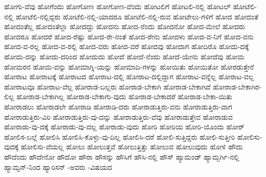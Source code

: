 {ಹೋಗು-ವೆವು
ಹೋಗೆಂದು
ಹೋಗೋಣ
ಹೋಗೋಣ-ವೆಂದು
ಹೋಟಲಿಗೆ
ಹೋಟಲಿ-ನಲ್ಲಿ
ಹೋಟಲ್
ಹೋಟೆಲಿ-ನಲ್ಲಿ
ಹೋಟೆಲಿ-ನಲ್ಲಿದ್ದರು
ಹೋಟೆಲಿ-ನಲ್ಲಿ-ಯಾದರೂ
ಹೋಟೆಲಿ-ನಲ್ಲಿ-ರುವ
ಹೋಟೇಲು-ಗಳಿಗೆ
ಹೋದ
ಹೋದಂತೆ
ಹೋದಂತೆಲ್ಲ
ಹೋದಂತೆಲ್ಲಾ
ಹೋದದ್ದು
ಹೋದನು
ಹೋದ-ನೆಂದು
ಹೋದನೋ
ಹೋದ-ಮೇಲೆ
ಹೋದರು
ಹೋದರೂ
ಹೋದರೆ
ಹೋದ-ರೆಷ್ಟು
ಹೋದ-ರೇ-ನಂತೆ
ಹೋದ-ರೇನು
ಹೋದಳು
ಹೋದ-ವ-ನಿಗೆ
ಹೋದ-ವನು
ಹೋದ-ವ-ರಲ್ಲ
ಹೋದ-ವ-ರಲ್ಲಿ
ಹೋದ-ವರು
ಹೋದ-ವರೆ
ಹೋದವು
ಹೋದಾಗ
ಹೋದಿರೊ
ಹೋದು-ದಕ್ಕೆ
ಹೋದು-ದನ್ನು
ಹೋದು-ದರಿಂದ
ಹೋದುದು
ಹೋದೆ
ಹೋದೆ-ನೆಂದು
ಹೋದೆ-ಯೇನು
ಹೋದೆವು
ಹೋಮ
ಹೋಮರನ
ಹೋಮ-ವನ್ನು
ಹೋಮಾಗ್ನಿ-ಯನ್ನು
ಹೋಮಾದಿ-ಗಳನ್ನು
ಹೋಯಿತು
ಹೋಯಿತೋ
ಹೋರಡುತ್ತೇನೆ
ಹೋರಾಟ
ಹೋರಾಟಕ್ಕೆ
ಹೋರಾಟದ
ಹೋರಾಟ-ದಲ್ಲಿ
ಹೋರಾಟ-ದಲ್ಲಿದ್ದಾಗ
ಹೋರಾಟ-ವನ್ನೆಲ್ಲ
ಹೋರಾಟ-ವಲ್ಲ
ಹೋರಾಟವೂ
ಹೋರಾಟ-ವೆಲ್ಲ
ಹೋರಾಡ-ಬಲ್ಲರು
ಹೋರಾಡ-ಬೇಕಾಗಿ
ಹೋರಾಡ-ಬೇಕಾಗಿದೆ
ಹೋರಾಡ-ಬೇಕಾಗಿರ-ಲಿಲ್ಲ
ಹೋರಾಡ-ಬೇಕಾಗಿಲ್ಲ
ಹೋರಾಡ-ಬೇಕಾಗು-ವುದು
ಹೋರಾಡ-ಬೇಕಾದರೆ
ಹೋರಾಡ-ಬೇಕಾ-ಯಿತು
ಹೋರಾಡಲು
ಹೋರಾಡಲೇ
ಹೋರಾಡಿ
ಹೋರಾಡಿ-ದರು
ಹೋರಾಡುತ್ತಿರು-ವನು
ಹೋರಾಡುತ್ತಿರು-ವಾಗ
ಹೋರಾಡುತ್ತಿರು-ವಿರಿ
ಹೋರಾಡುತ್ತಿರು-ವು-ದನ್ನು
ಹೋರಾಡುತ್ತಿರು-ವೆವು
ಹೋರಾಡುತ್ತೇವ
ಹೋರಾಡುವ
ಹೋರಾಡು-ವು-ದಕ್ಕೆ
ಹೋರಾಡು-ವು-ದಲ್ಲ
ಹೋರಾಡು-ವುದು
ಹೋರಿ
ಹೋರಿಯ
ಹೋರಿ-ಯೊಂದು
ಹೋರ್
ಹೋಲಿಸ-ಬಲ್ಲೆ
ಹೋಲಿಸಿ
ಹೋಲಿಸಿ-ಕೊಳ್ಳು-ವು-ದಿಲ್ಲ
ಹೋಲಿಸಿ-ದರೆ
ಹೋಲಿ-ಸುತ್ತಿದ್ದರು
ಹೋಲಿ-ಸುತ್ತೀರಿ
ಹೋಲಿಸು-ವುದಕ್ಕೆ
ಹೋಲಿಸು-ವೆಯಲ್ಲ
ಹೋಲು
ಹೋಲುತ್ತವೆ
ಹೋಲುತ್ತಿತ್ತು
ಹೋಲುವ
ಹೋಲುವುದು
ಹೋಳಿ
ಹೌದು
ಹೌದೆಂದು
ಹೌದೇನೋ
ಹೌದೋ
ಹೌರಾ
ಹೌಸನ್ನು
ಹೌಸಿಗೆ
ಹೌಸಿ-ನಲ್ಲಿ
ಹೌಸ್
ಹ್ಯಾಮಂಡ್
ಹ್ಯಾಮ್ಬರ್ಗಿ-ನಲ್ಲಿ
ಹ್ಯಾಮ್ಟನ್-ನಿಂದ
ಹ್ಯಾರಿಸನ್
-ಅವರು
-ವಿಷಯದ
}
